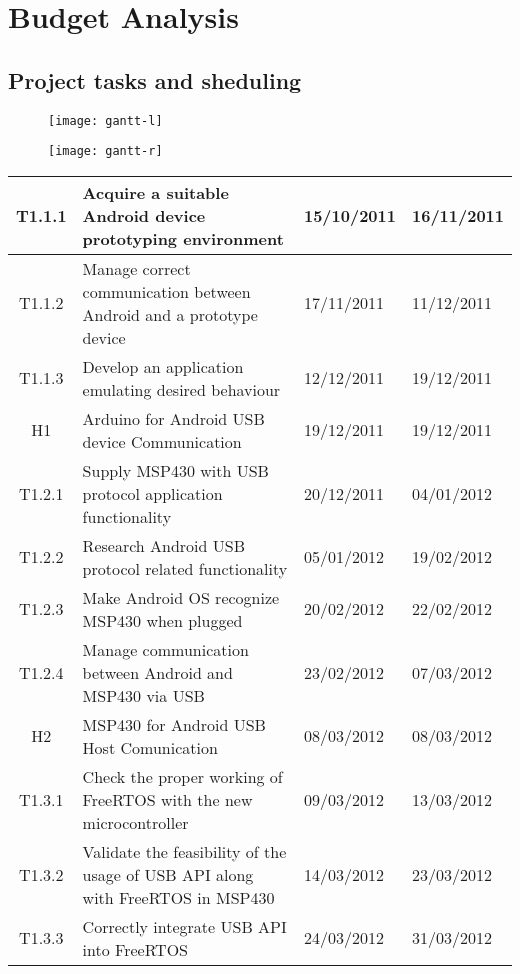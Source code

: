 \chapter{Budget Analysis}
\label{ch:budget}
	
	\section{Project tasks and sheduling}

		\begin{figure}[h]
			\centering
		    	\texttt{[image: gantt-l]}
			\label{fig:gantL}
		\end{figure}
		\begin{figure}[h]
			\centering
		    	\texttt{[image: gantt-r]}
			\label{fig:gantR}
		\end{figure}

		\begin{tabular}{| c | p{7cm} | l | l |} %
		\hline
T1.1.1 & Acquire a suitable Android device prototyping environment & 15/10/2011 & 16/11/2011\\ \hline
T1.1.2 & Manage correct communication between Android and a prototype device & 17/11/2011 & 11/12/2011\\ \hline
T1.1.3 & Develop an application emulating desired behaviour & 12/12/2011 & 19/12/2011\\ \hline
H1 & Arduino for Android USB device Communication & 19/12/2011 & 19/12/2011\\ \hline
T1.2.1 & Supply MSP430 with USB protocol application functionality & 20/12/2011 & 04/01/2012\\ \hline
T1.2.2 & Research Android USB protocol related functionality & 05/01/2012 & 19/02/2012\\ \hline
T1.2.3 & Make Android OS recognize MSP430 when plugged	 & 20/02/2012 & 22/02/2012\\ \hline
T1.2.4 & Manage communication between Android and MSP430 via USB & 23/02/2012 & 07/03/2012\\ \hline
H2 & MSP430 for Android USB Host Comunication & 08/03/2012 & 08/03/2012\\ \hline
T1.3.1 & Check the proper working of FreeRTOS with the new microcontroller & 09/03/2012 & 13/03/2012\\ \hline
T1.3.2 & Validate the feasibility of the usage of USB API along with FreeRTOS in MSP430 & 14/03/2012 & 23/03/2012\\ \hline
T1.3.3 & Correctly integrate USB API into FreeRTOS & 24/03/2012 & 31/03/2012\\ 
\hline
\end{tabular}\\\\

